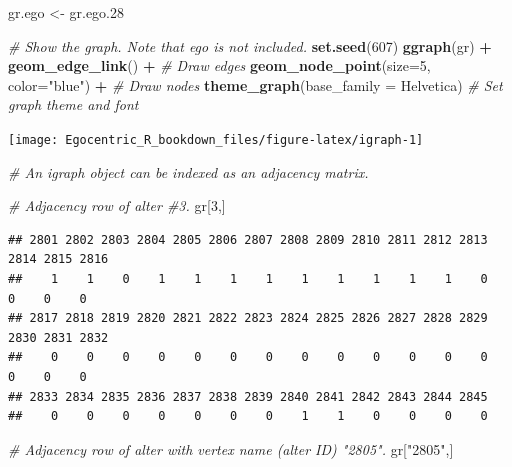 \documentclass[
]{book}
\newenvironment{Shaded}{\begin{snugshade}}{\end{snugshade}}
\newcommand{\AttributeTok}[1]{\textcolor[rgb]{0.13,0.29,0.53}{#1}}
\newcommand{\CommentTok}[1]{\textcolor[rgb]{0.56,0.35,0.01}{\textit{#1}}}
\newcommand{\DecValTok}[1]{\textcolor[rgb]{0.00,0.00,0.81}{#1}}
\newcommand{\FloatTok}[1]{\textcolor[rgb]{0.00,0.00,0.81}{#1}}
\newcommand{\FunctionTok}[1]{\textcolor[rgb]{0.13,0.29,0.53}{\textbf{#1}}}
\newcommand{\NormalTok}[1]{#1}
\newcommand{\OtherTok}[1]{\textcolor[rgb]{0.56,0.35,0.01}{#1}}
\newcommand{\SpecialCharTok}[1]{\textcolor[rgb]{0.81,0.36,0.00}{\textbf{#1}}}
\newcommand{\StringTok}[1]{\textcolor[rgb]{0.31,0.60,0.02}{#1}}
\begin{document}
\begin{Shaded}
\begin{Highlighting}[]
\NormalTok{gr.ego }\OtherTok{\textless{}{-}}\NormalTok{ gr.ego}\FloatTok{.28}

\CommentTok{\# Show the graph. Note that ego is not included.}
\FunctionTok{set.seed}\NormalTok{(}\DecValTok{607}\NormalTok{)}
\FunctionTok{ggraph}\NormalTok{(gr) }\SpecialCharTok{+} 
  \FunctionTok{geom\_edge\_link}\NormalTok{() }\SpecialCharTok{+} \CommentTok{\# Draw edges}
  \FunctionTok{geom\_node\_point}\NormalTok{(}\AttributeTok{size=}\DecValTok{5}\NormalTok{, }\AttributeTok{color=}\StringTok{"blue"}\NormalTok{) }\SpecialCharTok{+} \CommentTok{\# Draw nodes}
  \FunctionTok{theme\_graph}\NormalTok{(}\AttributeTok{base\_family =} \StringTok{\textquotesingle{}Helvetica\textquotesingle{}}\NormalTok{) }\CommentTok{\# Set graph theme and font}
\end{Highlighting}
\end{Shaded}

\begin{center}\texttt{[image: Egocentric\_R\_bookdown\_files/figure-latex/igraph-1]} \end{center}

\begin{Shaded}
\begin{Highlighting}[]
\CommentTok{\# An igraph object can be indexed as an adjacency matrix.}

\CommentTok{\# Adjacency row of alter \#3.}
\NormalTok{gr[}\DecValTok{3}\NormalTok{,]}
\end{Highlighting}
\end{Shaded}

\begin{verbatim}
## 2801 2802 2803 2804 2805 2806 2807 2808 2809 2810 2811 2812 2813 2814 2815 2816 
##    1    1    0    1    1    1    1    1    1    1    1    1    0    0    0    0 
## 2817 2818 2819 2820 2821 2822 2823 2824 2825 2826 2827 2828 2829 2830 2831 2832 
##    0    0    0    0    0    0    0    0    0    0    0    0    0    0    0    0 
## 2833 2834 2835 2836 2837 2838 2839 2840 2841 2842 2843 2844 2845 
##    0    0    0    0    0    0    0    1    1    0    0    0    0
\end{verbatim}

\begin{Shaded}
\begin{Highlighting}[]
\CommentTok{\# Adjacency row of alter with vertex name (alter ID) "2805".}
\NormalTok{gr[}\StringTok{"2805"}\NormalTok{,]}
\end{Highlighting}
\end{Shaded}
\end{document}
